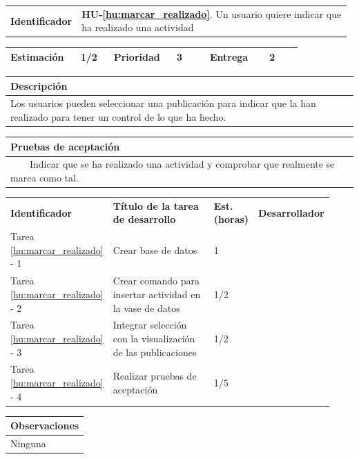\documentclass[11pt]{article}
\newcommand{\tabitem}{~~\llap{\textbullet}~~}
\begin{document}
\begin{longtable}{p{0.18\linewidth}|p{0.8\linewidth}}
  \rowcolor{LightCyan}
  \textbf{Identificador} & \textbf{{HU-\ref{hu:marcar_realizado}}}. Un usuario quiere indicar que ha realizado una actividad \\  
\end{longtable}
\vspace{-0.8cm}
\begin{longtable}{p{0.18\linewidth}|p{0.1\linewidth}|p{0.18\linewidth}|p{0.1\linewidth}|p{0.18\linewidth}|p{0.1\linewidth}}
  \toprule
  \textbf{Estimación} & 1/2 & \textbf{Prioridad} & 3 & \textbf{Entrega} & 2 \\
  \bottomrule
\end{longtable}
\vspace{-0.8cm}
\begin{longtable}{p{1.028\linewidth}}
  \textbf{Descripción}\\
  \midrule
  Los usuarios pueden seleccionar una publicación para indicar que la han realizado para tener un control de lo que ha hecho. \\
  \bottomrule
\end{longtable}
\vspace{-0.8cm}
\begin{longtable}{p{1.028\linewidth}}
  \textbf{Pruebas de aceptación}\\
  \midrule
  \tabitem Indicar que se ha realizado una actividad y comprobar que realmente se marca como tal.\\

\end{longtable}
\vspace{-0.8cm}
\begin{longtable}{p{0.18\linewidth}|p{0.48\linewidth}|p{0.1\linewidth}|p{0.17\linewidth}}
  \toprule
  \textbf{Identificador} & \textbf{Título de la tarea de desarrollo} & \textbf{Est. (horas)} & \textbf{Desarrollador} \\
  Tarea \ref{hu:marcar_realizado} - 1 & Crear base de datos & 1 &\\
  Tarea \ref{hu:marcar_realizado} - 2 & Crear comando para insertar actividad en la vase de datos & 1/2 & \\
  Tarea \ref{hu:marcar_realizado} - 3 & Integrar selección con la visualización de las publicaciones & 1/2 & \\
  Tarea \ref{hu:marcar_realizado} - 4 & Realizar pruebas de aceptación & 1/5 &  \\
  \bottomrule
\end{longtable}
\vspace{-0.8cm}
\begin{longtable}{p{1.028\linewidth}}
  \textbf{Observaciones}\\
  \midrule
  Ninguna\\
  \bottomrule
\end{longtable}
\end{document}
